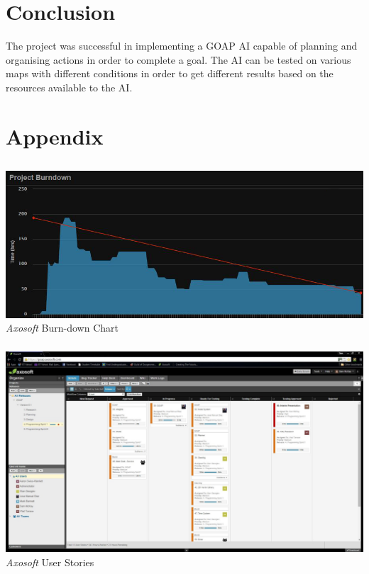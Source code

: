 \documentclass[a4paper]{report}
\begin{document}
\chapter{Conclusion}
The project was successful in implementing a GOAP AI capable of planning and organising actions in order to complete a goal. The AI can be tested on various maps with different conditions in order to get different results based on the resources available to the AI. 





\appendix
\chapter{Appendix}
\section{}
\subsection{}
	\includegraphics[width=1.0\linewidth]{./appendixImages/AxosoftScreenShot01}
	\textit{Axosoft} Burn-down Chart 
\subsection{}
	\includegraphics[width=1.0\linewidth]{./appendixImages/AxosoftScreenShot02}
	\textit{Axosoft} User Stories
\pagebreak
\end{document}
